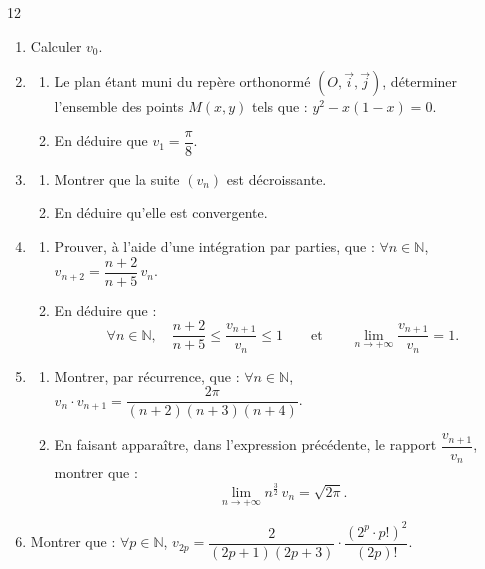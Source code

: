 \documentclass{axiobac}
\begin{document}
\begin{probleme}{12}
\begin{enumerate}
    \item Calculer $v_0$.
    \item
    \begin{enumerate}
        \item Le plan étant muni du repère orthonormé $(O, \vec{i}, \vec{j})$, déterminer l'ensemble des points $M(x, y)$ tels que : $y^2 - x(1 - x) = 0$.
        \item En déduire que $v_1 = \dfrac{\pi}{8}$.
    \end{enumerate}
    \item
    \begin{enumerate}
        \item Montrer que la suite $(v_n)$ est décroissante.
        \item En déduire qu'elle est convergente.
    \end{enumerate}
    \item
    \begin{enumerate}
        \item Prouver, à l'aide d'une intégration par parties, que : $\forall n \in \mathbb{N}$, $v_{n+2} = \dfrac{n + 2}{n + 5}\,v_n$.
        \item En déduire que :
        \[
        \forall n \in \mathbb{N}, \quad \frac{n + 2}{n + 5} \leqslant \frac{v_{n+1}}{v_n} \leqslant 1 \qquad \text{et} \qquad \lim_{n \to +\infty} \frac{v_{n+1}}{v_n} = 1 .
        \]
    \end{enumerate}
    \item
    \begin{enumerate}
        \item Montrer, par récurrence, que : $\forall n \in \mathbb{N}$, $v_n \cdot v_{n+1} = \dfrac{2\pi}{(n + 2)(n + 3)(n + 4)}$.
        \item En faisant apparaître, dans l'expression précédente, le rapport $\dfrac{v_{n+1}}{v_n}$, montrer que :
        \[
        \lim_{n \to +\infty} n^{\frac32}\, v_n = \sqrt{2\pi} .
        \]
    \end{enumerate}
    \item Montrer que : $\forall p \in \mathbb{N}$, $v_{2p} = \dfrac{2}{(2p + 1)(2p + 3)} \cdot \dfrac{\left(2^p \cdot p!\right)^2}{(2p)!}$.
\end{enumerate}



\end{probleme}
\end{document}
